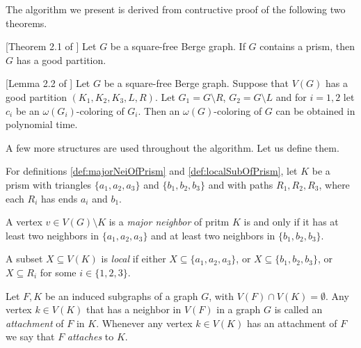 The algorithm we present is derived from contructive proof of the following two theorems.

\begin{theorem}{}[Theorem 2.1 of \cite{coloringSquareFree}]
  Let $G$ be a square-free Berge graph. If $G$ contains a prism, then $G$ has a good partition.
\end{theorem}

\begin{theorem}{}[Lemma 2.2 of \cite{coloringSquareFree}]
  Let $G$ be a square-free Berge graph. Suppose that $V(G)$ has a good partition $(K_1, K_2, K_3, L, R)$. Let $G_1 = G \setminus R$, $G_2 = G \setminus L$ and for $i = 1,2$ let $c_i$ be an $\omega(G_i)$-coloring of $G_i$. Then an $\omega(G)$-coloring of $G$ can be obtained in polynomial time.
\end{theorem}

A few more structures are used throughout the algorithm. Let us define them.

For definitions \ref{def:majorNeiOfPrism} and \ref{def:localSubOfPrism}, let $K$ be a prism with triangles $\{a_1, a_2, a_3\}$ and $\{b_1, b_2, b_3\}$ and with paths $R_1, R_2, R_3$, where each $R_i$ has ends $a_i$ and $b_1$.

\begin{defnTwo}
  A vertex $v \in V(G) \setminus K$ is a \emph{major neighbor} of pritm $K$ is and only if it has at least two neighbors in $\{a_1, a_2, a_3\}$ and at least two neighbors in $\{b_1, b_2, b_3\}$.
  \label{def:majorNeiOfPrism}
\end{defnTwo}

\begin{defnTwo}
  A subset $X \subseteq V(K)$ is \emph{local} if either $X \subseteq \{a_1, a_2, a_3\}$, or $X \subseteq \{b_1, b_2, b_3\}$, or $X \subseteq R_i$ for some $i \in \{1, 2, 3\}$.
  \label{def:localSubOfPrism}
\end{defnTwo}

\begin{defnTwo}[attachment]
  Let $F, K$ be an induced subgraphs of a graph $G$, with $V(F) \cap V(K) = \emptyset$. Any vertex $k \in V(K)$ that has a neighbor in $V(F)$ in a graph $G$ is called an \emph{attachment} of $F$ in $K$. Whenever any vertex $k \in V(K)$ has an attachment of $F$ we say that $F$ \emph{attaches} to $K$.
\end{defnTwo}

